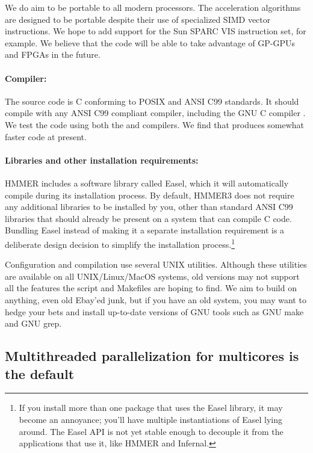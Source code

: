 We do aim to be portable to all modern processors. The acceleration
algorithms are designed to be portable despite their use of
specialized SIMD vector instructions. We hope to add support for the
Sun SPARC VIS instruction set, for example. We believe that the code
will be able to take advantage of GP-GPUs and FPGAs in the future.

\paragraph{Compiler:} The source code is C conforming to POSIX and ANSI
C99 standards. It should compile with any ANSI C99 compliant compiler,
including the GNU C compiler . We test the code using both
the  and  compilers. We find that 
produces somewhat faster code at present.

\paragraph{Libraries and other installation requirements:} HMMER includes
a software library called Easel, which it will automatically compile
during its installation process.  By default, HMMER3 does not require
any additional libraries to be installed by you, other than standard
ANSI C99 libraries that should already be present on a system that can
compile C code. Bundling Easel instead of making it a separate
installation requirement is a deliberate design decision to simplify
the installation process.\footnote{If you install more than one
  package that uses the Easel library, it may become an annoyance;
  you'll have multiple instantiations of Easel lying around. The Easel
  API is not yet stable enough to decouple it from the applications
  that use it, like HMMER and Infernal.}

Configuration and compilation use several UNIX utilities. Although
these utilities are available on all UNIX/Linux/MacOS systems, old
versions may not support all the features the 
script and Makefiles are hoping to find. We aim to build on anything,
even old Ebay'ed junk, but if you have an old system, you may want to
hedge your bets and install up-to-date versions of GNU tools such as
GNU make and GNU grep.


\subsection{Multithreaded parallelization for multicores is the default}

